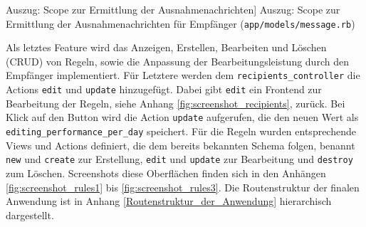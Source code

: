 \begin{listing}[!ht]
\inputminted[firstline=6, lastline=15, linenos]{ruby}{Listings/Pkg3/message.rb}

\caption
    [Auszug: Scope zur Ermittlung der Ausnahmenachrichten]
    {Auszug: Scope zur Ermittlung der Ausnahmenachrichten für Empfänger (\texttt{app/models/message.rb})}

\label{lst:message3}
\end{listing}

\noindent Als letztes Feature wird das Anzeigen, Erstellen, Bearbeiten und Löschen (CRUD) von Regeln, sowie die Anpassung der Bearbeitungsleistung durch den Empfänger implementiert. Für Letztere werden dem \texttt{recipients\_controller} die Actions \texttt{edit} und \texttt{update} hinzugefügt. Dabei gibt \texttt{edit} ein Frontend zur Bearbeitung der Regeln, siehe Anhang \ref{fig:screenshot_recipients}, zurück. Bei Klick auf den Button wird die Action \texttt{update} aufgerufen, die den neuen Wert als \texttt{editing\_performance\_per\_day} speichert. Für die Regeln wurden entsprechende Views und Actions definiert, die dem bereits bekannten Schema folgen, benannt \texttt{new} und \texttt{create} zur Erstellung, \texttt{edit} und \texttt{update} zur Bearbeitung und \texttt{destroy} zum Löschen. Screenshots diese Oberflächen finden sich in den Anhängen \ref{fig:screenshot_rules1} bis \ref{fig:screenshot_rules3}. Die Routenstruktur der finalen Anwendung ist in Anhang \ref{Routenstruktur_der_Anwendung} hierarchisch dargestellt.